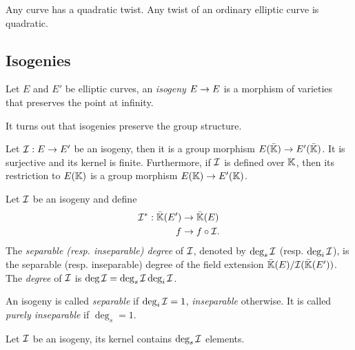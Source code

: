 \begin{proposition}
  Any curve has a quadratic twist. Any twist of an ordinary elliptic
  curve is quadratic.
\end{proposition}


\subsection{Isogenies}
\label{sec:isogenies}

\begin{definition}[Isogeny]
  Let $E$ and $E'$ be elliptic curves, an
  \emph{isogeny} $E\rightarrow E$ is a morphism of varieties
  that preserves the point at infinity.
\end{definition}

It turns out that isogenies preserve the group structure.

\begin{theorem}
  Let $\mathcal{I}:E\rightarrow E'$ be an isogeny, then it is a group morphism
  $E(\bar{\mathbb{K}})\rightarrow E'(\bar{\mathbb{K}})$. It is surjective and its kernel is
  finite. Furthermore, if $\mathcal{I}$ is defined over $\mathbb{K}$, then its
  restriction to $E(\mathbb{K})$ is a group morphism $E(\mathbb{K})\rightarrow E'(\mathbb{K})$.
\end{theorem}

\begin{definition}[Degree]
  Let $\mathcal{I}$ be an isogeny and
  define
  \begin{equation}
    \label{eq:138}
    \begin{aligned}
      \mathcal{I}^\ast:\bar{\mathbb{K}}(E')&\rightarrow\bar{\mathbb{K}}(E)\\
      f &\rightarrow f\circ\mathcal{I}
      \text{.}
    \end{aligned}
  \end{equation}
  The \emph{separable (resp. inseparable) degree} of $\mathcal{I}$, denoted by
  $\deg_s\mathcal{I}$ (resp. $\deg_i\mathcal{I}$), is the separable (resp. inseparable)
  degree of the field extension $\bar{\mathbb{K}}(E)/\mathcal{I}(\bar{\mathbb{K}}(E'))$. The
  \emph{degree} of $\mathcal{I}$ is $\deg\mathcal{I}=\deg_s\mathcal{I}\deg_i\mathcal{I}$.

  An isogeny is called \emph{separable} if
  $\deg_i\mathcal{I}=1$, \emph{inseparable}
  otherwise. It is called
  \emph{purely inseparable} if
  $\deg_s=1$.
\end{definition}

\begin{theorem}
  Let $\mathcal{I}$ be an isogeny, its kernel contains $\deg_s\mathcal{I}$ elements.
\end{theorem}

